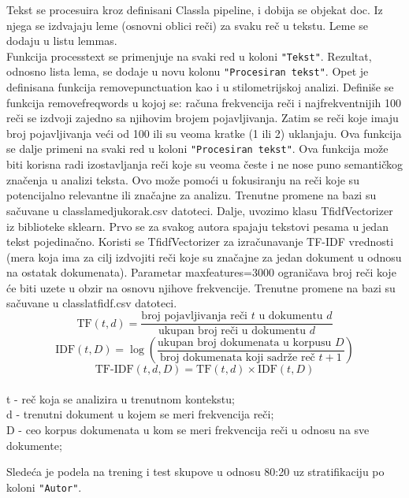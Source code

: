 \documentclass{article}
\begin{document}
\begin{flushleft}
    Tekst se procesuira kroz definisani Classla pipeline, i dobija se objekat doc.
    Iz njega se izdvajaju leme (osnovni oblici reči) za svaku reč u tekstu. Leme 
    se dodaju u listu lemmas.\\

Funkcija process\textunderscore text se primenjuje na svaki red u koloni \texttt{"Tekst"}. Rezultat, odnosno lista lema, se dodaje u novu kolonu \texttt{"Procesiran tekst"}. Opet je definisana funkcija remove\textunderscore  punctuation  kao i u stilometrijskoj analizi. Definiše se funkcija remove\textunderscore freq\textunderscore words u kojoj se: računa frekvencija reči i najfrekventnijih 100 reči se izdvoji zajedno sa njihovim 
brojem pojavljivanja. Zatim se reči koje imaju broj pojavljivanja veći od 100 ili 
su veoma kratke (1 ili 2) uklanjaju. Ova funkcija se dalje primeni na svaki red u 
koloni \texttt{"Procesiran tekst"}. Ova funkcija može biti korisna radi izostavljanja reči koje su veoma česte i ne nose puno semantičkog značenja u analizi teksta. Ovo može pomoći u fokusiranju na reči koje su potencijalno relevantne ili značajne za analizu. Trenutne promene na bazi su sačuvane u classla\textunderscore medjukorak.csv datoteci.
\vspace{2pt}
Dalje, uvozimo klasu TfidfVectorizer iz biblioteke sklearn. 
Prvo se za svakog autora spajaju tekstovi pesama u jedan tekst pojedinačno.
Koristi se TfidfVectorizer za izračunavanje TF-IDF vrednosti (mera koja ima za cilj
izdvojiti reči koje su značajne za jedan dokument u odnosu na ostatak dokumenata). 
Parametar max\textunderscore features=3000 ograničava broj reči koje će biti uzete 
u obzir na osnovu njihove frekvencije. Trenutne promene na bazi su sačuvane u classla\textunderscore tfidf.csv datoteci.
\hspace{3pt} \[ \text{TF}(t, d) = \frac{\text{broj pojavljivanja reči } t \text{ u
dokumentu } d}{\text{ukupan broj reči u dokumentu } d} \]
\hspace{3pt} \[ \text{IDF}(t, D) = \log\left(\frac{\text{ukupan broj dokumenata u 
korpusu } D}{\text{broj dokumenata koji sadrže reč } t + 1}\right) \]
\hspace{3pt} \[ \text{TF-IDF}(t, d, D) = \text{TF}(t, d) \times \text{IDF}(t, D) 
\] \\
\vspace{3pt}
\hspace{60pt}t - reč koja se analizira u trenutnom kontekstu;\\
\hspace{60pt}d - trenutni dokument u kojem se meri frekvencija reči;\\
\hspace{60pt}D - ceo korpus dokumenata u kom se meri frekvencija reči u odnosu na 
sve dokumente;
\vspace{4pt}

\vspace{7pt}
Sledeća je podela na trening i test skupove u odnosu 80:20 uz stratifikaciju po koloni \verb|"Autor"|.
\end{flushleft}
\end{document}
